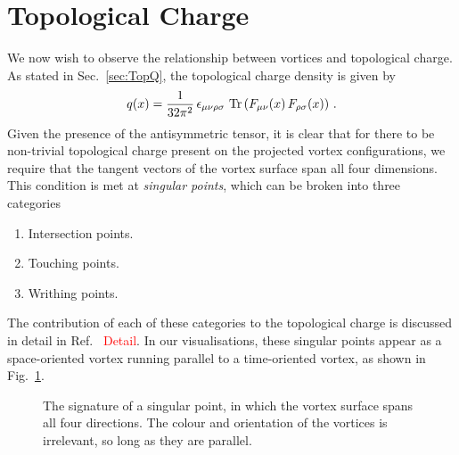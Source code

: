 \section{Topological Charge}\label{sec:TopChargeVis}
We now wish to observe the relationship between vortices and topological charge. As stated in Sec.~\ref{sec:TopQ}, the topological charge density is given by
%
\begin{equation}
q ( x ) = \frac { 1 } { 32 \pi ^ { 2 } } \, \epsilon _ { \mu \nu \rho \sigma } \, \operatorname{Tr}\left( F _ { \mu \nu }( x ) \, F _ { \rho \sigma }(x) \right) \, .
\end{equation}
%
Given the presence of the antisymmetric tensor, it is clear that for there to be non-trivial topological charge present on the projected vortex configurations, we require that the tangent vectors of the vortex surface span all four dimensions. This condition is met at \textit{singular points}, which can be broken into three categories~\cite{Engelhardt:2010ft,Engelhardt:2000wc}
\begin{enumerate}
\item Intersection points.
\item Touching points.
\item Writhing points.
\end{enumerate}
The contribution of each of these categories to the topological charge is discussed in detail in Ref.~\cite{} \textcolor{red}{Detail}. In our visualisations, these singular points appear as a space-oriented vortex running parallel to a time-oriented vortex, as shown in Fig.~\ref{fig:SingularPoint}.\\
%
\begin{figure}[htb!]
\centering

\caption{\label{fig:SingularPoint} The signature of a singular point, in which the vortex surface spans all four directions. The colour and orientation of the vortices is irrelevant, so long as they are parallel.}
\end{figure}
%

